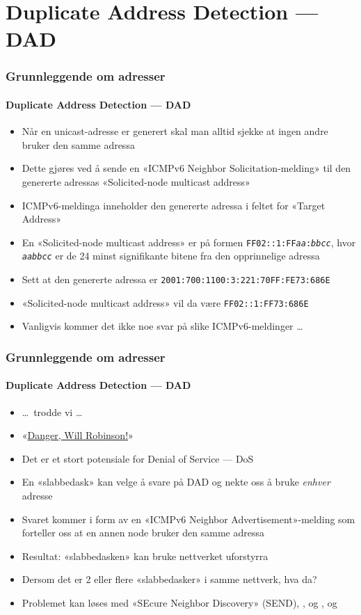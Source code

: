 \section{Duplicate Address Detection --- DAD}
\begin{frame}%
  \frametitle{Grunnleggende om adresser}
  \framesubtitle{Duplicate Address Detection --- DAD}
  \begin{itemize}%
  \item Når en unicast-adresse er generert skal man alltid sjekke at
    ingen andre bruker den samme adressa\hfill{}
  \item Dette gjøres ved å sende en «ICMPv6 Neighbor
    Solicitation-melding» til den genererte adressas «Solicited-node
    multicast address»
  \item ICMPv6-meldinga inneholder den genererte adressa i feltet for
    «Target Address»\hfill{}
  \item En «Solicited-node multicast address» er på formen
    \texttt{FF02::1:FF\alert{\textit{aa}}:\alert{\textit{bbcc}}},
    hvor \alert{\texttt{\textit{aabbcc}}} er de 24 minst
    signifikante bitene fra den opprinnelige adressa\hfill{}
  \item Sett at den genererte adressa er
    \texttt{2001:700:1100:3:221:70FF:FE\alert{73}:\alert{686E}}
  \item «Solicited-node multicast address» vil da være
    \texttt{FF02::1:FF\alert{73}:\alert{686E}}
  \item Vanligvis kommer det ikke noe svar på slike ICMPv6-meldinger
    \dots
  \end{itemize}
\end{frame}

\begin{frame}%
  \frametitle{Grunnleggende om adresser}
  \framesubtitle{Duplicate Address Detection --- DAD}
  \begin{itemize}%
  \item \dots\ trodde vi \dots
  \item «\href{http://en.wikipedia.org/wiki/Danger,_Will_Robinson}{Danger, Will Robinson!}»
  \item Det er et stort potensiale for Denial of Service --- DoS\hfill{}
  \item En «slabbedask» kan velge å svare på DAD og nekte oss å bruke
    \textit{enhver\/} adresse
  \item Svaret kommer i form av en «ICMPv6 Neighbor
    Advertisement»-melding som forteller oss at en annen node bruker
    den samme adressa\hfill{}
  \item Resultat: «slabbedasken» kan bruke nettverket uforstyrra
  \item Dersom det er 2 eller flere «slabbedasker» i samme nettverk, hva da?
  \item Problemet kan løses med «SEcure Neighbor Discovery» (SEND),
    , og ,  og 
  \end{itemize}
\end{frame}

